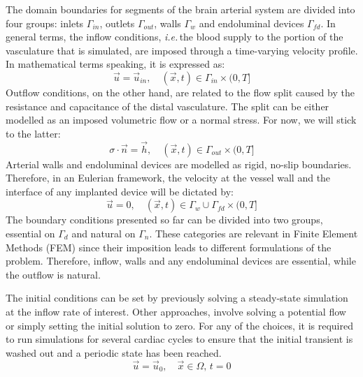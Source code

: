 The domain boundaries for segments of the brain arterial system are divided into four groups: inlets $\Gamma_{in}$, outlets $\Gamma_{out}$, walls $\Gamma_{w}$ and endoluminal devices $\Gamma_{fd}$. In general terms, the inflow conditions, \textit{i.e.}\,the blood supply to the portion of the vasculature that is simulated, are imposed through a time-varying velocity profile. In mathematical terms speaking, it is expressed as:
\begin{equation*}
	\vec{u} = \vec{u}_{in}, \quad (\vec{x}, t) \in \Gamma_{in} \times (0,T]
\end{equation*}
Outflow conditions, on the other hand, are related to the flow split caused by the resistance and capacitance of the distal vasculature. The split can be either modelled as an imposed volumetric flow or a normal stress. For now, we will stick to the latter:
\begin{equation*}
	\sigma \cdot \vec{n} = \vec{h}, \quad (\vec{x}, t) \in \Gamma_{out} \times (0,T]
\end{equation*}
Arterial walls and endoluminal devices are modelled as rigid, no-slip boundaries. Therefore, in an Eulerian framework, the velocity at the vessel wall and the interface of any implanted device will be dictated by:
\begin{equation*}
	\vec{u} = 0, \quad (\vec{x}, t) \in \Gamma_{w}\cup\Gamma_{fd}  \times (0,T]
\end{equation*}
The boundary conditions presented so far can be divided into two groups, essential on $\Gamma_{d}$ and natural on $\Gamma_{n}$. These categories are relevant in Finite Element Methods (FEM) since their imposition leads to different formulations of the problem. Therefore, inflow, walls and any endoluminal devices are essential, while the outflow is natural.

The initial conditions can be set by previously solving a steady-state simulation at the inflow rate of interest. Other approaches, involve solving a potential flow or simply setting the initial solution to zero. For any of the choices, it is required to run simulations for several cardiac cycles to ensure that the initial transient is washed out and a periodic state has been reached.
\begin{equation*}
	\vec{u} = \vec{u}_0, \quad \vec{x} \in \Omega,\,t=0
\end{equation*}


